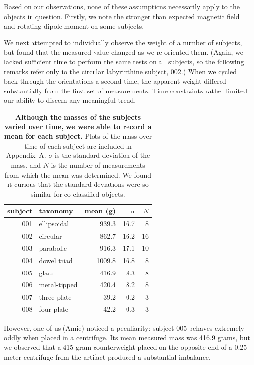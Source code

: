 \documentclass[10pt]{article}
\theoremstyle{definition}
\begin{document}
Based on our observations, none of these assumptions necessarily apply to the objects in question.
Firstly, we note the stronger than expected magnetic field and rotating dipole moment on some subjects.

We next attempted to individually observe the weight of a number of subjects, but found that the measured value changed as we re-oriented them.
(Again, we lacked sufficient time to perform the same tests on all subjects, so the following remarks refer only to the circular labyrinthine subject, 002.)
When we cycled back through the orientations a second time, the apparent weight differed substantially from the first set of measurements.
Time constraints rather limited our ability to discern any meaningful trend.

\begin{table}
\begin{tabular}{rlrrr}%
subject & taxonomy & mean (g) & $\sigma$ & $N$ \\
\hline
001 & ellipsoidal & 939.3 & 16.7 & 8 \\
002 & circular & 862.7 & 16.2 & 16 \\
003 & parabolic & 916.3 & 17.1 & 10 \\
004 & dowel triad & 1009.8 & 16.8 & 8 \\
005 & glass & 416.9 & 8.3 & 8 \\
006 & metal-tipped & 420.4 & 8.2 & 8 \\
007 & three-plate & 39.2 & 0.2 & 3 \\
008 & four-plate & 42.2 & 0.3 & 3 \\
\hline
\end{tabular}
\caption{\label{tab:mass}\textbf{Although the masses of the subjects varied over time, we were able to record a mean for each subject.} Plots of the mass over time of each subject are included in Appendix~A. $\sigma$ is the standard deviation of the mass, and $N$ is the number of measurements from which the mean was determined. We found it curious that the standard deviations were so similar for co-classified objects.}
\end{table}

However, one of us (Amie) noticed a peculiarity: subject 005 behaves extremely oddly when placed in a centrifuge.
Its mean measured mass was 416.9 grams, but we observed that a 415-gram counterweight placed on the opposite end of a 0.25-meter centrifuge from the artifact produced a substantial imbalance.
\end{document}
